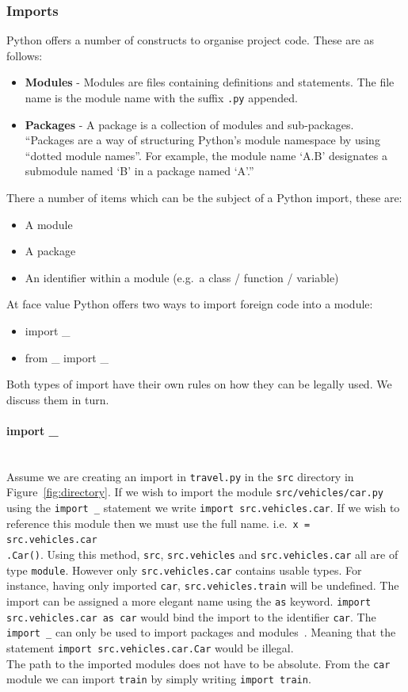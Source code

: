 \documentclass[12pt, titlepage]{article}
\begin{document}
\subsubsection{Imports}
\label{chap:imports}
Python offers a number of constructs to organise project code. These are as follows:
\begin{itemize}
	\item \textbf{Modules} - Modules are files containing definitions and statements. The file name is the module name with the suffix \texttt{.py} appended.~\cite{pythonImports}
	\item \textbf{Packages} - A package is a collection of modules and sub-packages. ``Packages are a way of structuring Python's module namespace by using ``dotted module names''. For example, the module name `A.B' designates a submodule named `B' in a package named `A'.''
\end{itemize}
There a number of items which can be the subject of a Python import, these are:
\begin{itemize}
	\item A module
	\item A package
	\item An identifier within a module (e.g.\ a class / function / variable)
\end{itemize}
At face value Python offers two ways to import foreign code into a module:
\begin{itemize}
	\item import \_
	\item from \_ import \_
\end{itemize}
Both types of import have their own rules on how they can be legally used. We discuss them in turn.

\paragraph*{import \_} \mbox{} \\
Assume we are creating an import in \texttt{travel.py} in the \texttt{src} directory in Figure~\ref{fig:directory}. If we wish to import the module \texttt{src/vehicles/car.py} using the \texttt{import \_} statement we write \texttt{import src.vehicles.car}. If we wish to reference this module then we must use the full name. i.e.\ \texttt{x = src.vehicles.car\\.Car()}. Using this method, \texttt{src}, \texttt{src.vehicles} and \texttt{src.vehicles.car} all are of type \texttt{module}. However only \texttt{src.vehicles.car} contains usable types. For instance, having only imported \texttt{car}, \texttt{src.vehicles.train} will be undefined. The import can be assigned a more elegant name using the \texttt{as} keyword. \texttt{import src.vehicles.car as car} would bind the import to the identifier \texttt{car}. The \texttt{import \_} can only be used to import packages and modules~\cite{VanRossumImports}. Meaning that the statement \texttt{import src.vehicles.car.Car} would be illegal. \\
\indent The path to the imported modules does not have to be absolute. From the \texttt{car} module we can import \texttt{train} by simply writing \texttt{import train}.
\end{document}
